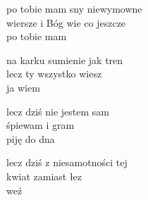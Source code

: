\begin{text}
    po tobie mam sny niewymowne\\
    wiersze i Bóg wie co jeszcze\\
    po tobie mam

    na karku sumienie jak tren\\
    lecz ty wszystko wiesz\\
    ja wiem

    lecz dziś nie jestem sam\\
    śpiewam i gram\\
    piję do dna

    lecz dziś z niesamotności tej\\
    kwiat zamiast łez\\
    weź
\end{text}
\begin{chord}

\end{chord}